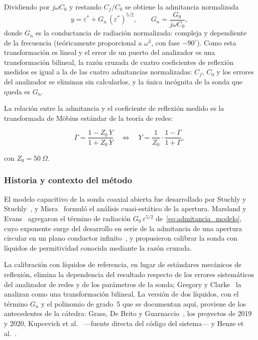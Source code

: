 Dividiendo por $j\omega C_0$ y restando $C_f/C_0$ se obtiene la admitancia
normalizada
\[
    y = \varepsilon^* + G_n\,(\varepsilon^*)^{5/2},
    \qquad
    G_n = \frac{G_0}{j\omega C_0},
\]
donde $G_n$ es la conductancia de radiación normalizada: compleja y dependiente
de la frecuencia (teóricamente proporcional a $\omega^3$, con fase $-90^\circ$).
Como esta transformación es lineal y el error de un puerto del analizador es una
transformación bilineal, la razón cruzada de cuatro coeficientes de reflexión
medidos es igual a la de las cuatro admitancias normalizadas: $C_f$, $C_0$ y los
errores del analizador se eliminan sin calcularlos, y la única incógnita de la
sonda que queda es $G_n$.

La relación entre la admitancia y el coeficiente de reflexión medido es la
transformada de Möbius estándar de la teoría de redes:

\begin{equation}
    \Gamma = \frac{1 - Z_0\,Y}{1 + Z_0\,Y}
    \quad \Longleftrightarrow \quad
    Y = \frac{1}{Z_0}\cdot\frac{1 - \Gamma}{1 + \Gamma},
\end{equation}

\noindent con $Z_0 = 50~\Omega$.

\subsubsection{Historia y contexto del método}

El modelo capacitivo de la sonda coaxial abierta fue desarrollado por Stuchly y
Stuchly~\cite{stuchly1980}, y Misra~\cite{misra1990} formuló el análisis
cuasi-estático de la apertura. Marsland y Evans~\cite{marsland1987} agregaron el
término de radiación $G_0\,\varepsilon^{5/2}$ de~\eqref{eq:admitancia_modelo},
cuyo exponente surge del desarrollo en serie de la admitancia de una apertura
circular en un plano conductor infinito~\cite{marcuvitz}, y propusieron calibrar
la sonda con líquidos de permitividad conocida mediante la razón cruzada.

La calibración con líquidos de referencia, en lugar de estándares mecánicos de
reflexión, elimina la dependencia del resultado respecto de los errores
sistemáticos del analizador de redes y de los parámetros de la sonda; Gregory y
Clarke~\cite{gregory2007} la analizan como una transformación bilineal. La versión
de dos líquidos, con el término $G_n$ y el polinomio de grado~5 que se documentan
aquí, proviene de los antecedentes de la cátedra: Grass, De Brito y
Guarnaccio~\cite{grass2016}, los proyectos de 2019 y 2020, Kupcevich
et al.~\cite{kupcevich2024} ---fuente directa del código del sistema--- y Henze
et al.~\cite{henze2024}.

